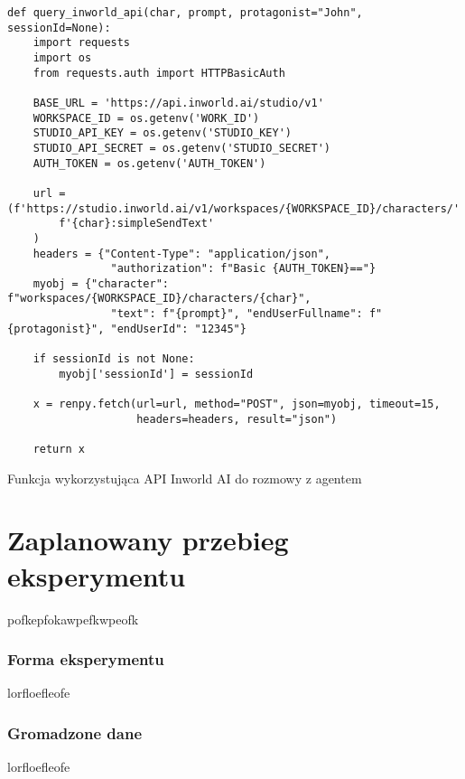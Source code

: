 \begin{listing}
    \begin{verbatim}  
def query_inworld_api(char, prompt, protagonist="John", sessionId=None):
    import requests
    import os
    from requests.auth import HTTPBasicAuth

    BASE_URL = 'https://api.inworld.ai/studio/v1'
    WORKSPACE_ID = os.getenv('WORK_ID')
    STUDIO_API_KEY = os.getenv('STUDIO_KEY')
    STUDIO_API_SECRET = os.getenv('STUDIO_SECRET')
    AUTH_TOKEN = os.getenv('AUTH_TOKEN')

    url = (f'https://studio.inworld.ai/v1/workspaces/{WORKSPACE_ID}/characters/'
        f'{char}:simpleSendText'
    )
    headers = {"Content-Type": "application/json",
                "authorization": f"Basic {AUTH_TOKEN}=="}
    myobj = {"character": f"workspaces/{WORKSPACE_ID}/characters/{char}",
                "text": f"{prompt}", "endUserFullname": f"{protagonist}", "endUserId": "12345"}

    if sessionId is not None:
        myobj['sessionId'] = sessionId

    x = renpy.fetch(url=url, method="POST", json=myobj, timeout=15,
                    headers=headers, result="json")

    return x
\end{verbatim}
    \caption{Funkcja wykorzystująca API Inworld AI do rozmowy z agentem} \label{listing:myListing}
\end{listing}

\lipsum[1]

\section{Zaplanowany przebieg eksperymentu}\label{section:ch4_3}

pofkepfokawpefkwpeofk

\subsubsection*{Forma eksperymentu}

lorfloefleofe

\subsubsection*{Gromadzone dane}

lorfloefleofe